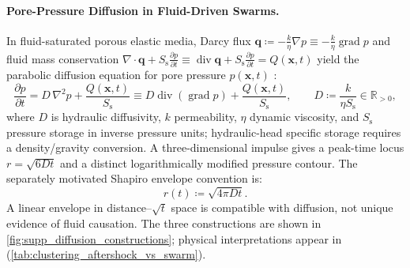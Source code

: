 \paragraph{Pore-Pressure Diffusion in Fluid-Driven Swarms.}
In fluid-saturated porous elastic media, Darcy flux $\mathbf{q}
\coloneqq -\frac{k}{\eta}\nabla p \equiv -\frac{k}{\eta}\operatorname{grad} p$
and fluid mass conservation $\nabla \cdot \mathbf{q} +
S_{\mathrm{s}}\frac{\partial p}{\partial t} \equiv \operatorname{div}\mathbf{q}
+ S_{\mathrm{s}}\frac{\partial p}{\partial t} = Q(\mathbf{x}, t)$ yield the
parabolic diffusion equation for pore pressure $p(\mathbf{x}, t)$
\parencite{rice1976}:
\begin{equation}
  \frac{\partial p}{\partial t} = D \, \nabla^2 p +
  \frac{Q(\mathbf{x}, t)}{S_{\mathrm{s}}} \equiv D
  \operatorname{div}(\operatorname{grad} p)
  + \frac{Q(\mathbf{x}, t)}{S_{\mathrm{s}}}, \qquad D \coloneqq
  \frac{k}{\eta S_{\mathrm{s}}} \in \mathbb{R}_{>0},
  \label{eq:clustering_diffusion_pde}
\end{equation}
where $D$ is hydraulic diffusivity, $k$ permeability, $\eta$ dynamic
viscosity, and $S_{\mathrm{s}}$ pressure storage in inverse pressure
units; hydraulic-head specific storage requires a density/gravity
conversion. A three-dimensional impulse gives a peak-time locus
$r=\sqrt{6Dt}$ and a distinct logarithmically modified pressure contour.
The separately motivated Shapiro envelope convention
\parencite{shapiro1997} is:
\begin{equation}
  r(t) \coloneqq \sqrt{4\pi D t}.
  \label{eq:clustering_shapiro_front}
\end{equation}
A linear envelope in distance--$\sqrt t$ space is compatible with diffusion,
not unique evidence of fluid causation. The three constructions are shown
in \cref{fig:supp_diffusion_constructions}; physical interpretations appear in
(\cref{tab:clustering_aftershock_vs_swarm}).

